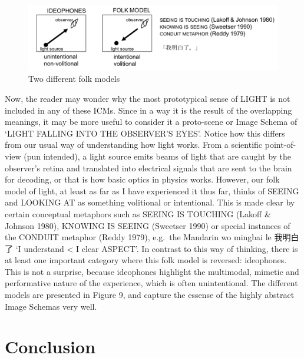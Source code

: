 \documentclass[12pt,article,oneside]{memoir}
\theoremstyle{definition}
\theoremstyle{definition}
\theoremstyle{definition}
\theoremstyle{remark}
\begin{document}
\begin{figure}
\includegraphics[width=22.43in]{ideos/folkmodel} \caption{Two different folk models}\label{fig:folk}
\end{figure}

Now, the reader may wonder why the most prototypical sense of LIGHT is
not included in any of these ICMs. Since in a way it is the result of
the overlapping meanings, it may be more useful to consider it a
proto-scene or Image Schema of `LIGHT FALLING INTO THE OBSERVER'S EYES'.
Notice how this differs from our usual way of understanding how light
works. From a scientific point-of-view (pun intended), a light source
emits beams of light that are caught by the observer's retina and
translated into electrical signals that are sent to the brain for
decoding, or that is how basic optics in physics works. However, our
folk model of light, at least as far as I have experienced it thus far,
thinks of SEEING and LOOKING AT as something volitional or intentional.
This is made clear by certain conceptual metaphors such as SEEING IS
TOUCHING (Lakoff \& Johnson 1980), KNOWING IS SEEING (Sweetser 1990) or
special instances of the CONDUIT metaphor (Reddy 1979), e.g.~the
Mandarin wo mingbai le 我明白了 `I understand \textless{} I clear
ASPECT'. In contrast to this way of thinking, there is at least one
important category where this folk model is reversed: ideophones. This
is not a surprise, because ideophones highlight the multimodal, mimetic
and performative nature of the experience, which is often unintentional.
The different models are presented in Figure 9, and capture the essense
of the highly abstract Image Schemas very well.

\section{Conclusion}\label{conclusion}
\end{document}
